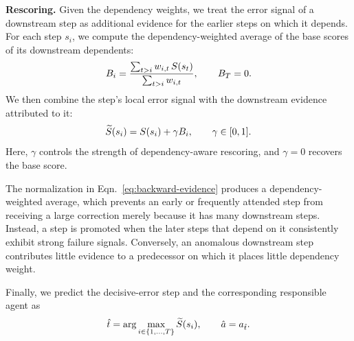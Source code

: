 \textbf{Rescoring.}
Given the dependency weights, we treat the error signal of a downstream
step as additional evidence for the earlier steps on which it depends.
For each step $s_i$, we compute the dependency-weighted average of the
base scores of its downstream dependents:
\begin{equation}
    B_i
    =
    \frac{
        \sum_{t>i}
        w_{i,t}\,S(s_t)
    }{
        \sum_{t>i}w_{i,t}
    },
    \qquad
    B_T=0.
    \label{eq:backward-evidence}
\end{equation}
We then combine the step's local error signal with the downstream evidence attributed to it:
\begin{equation}
    \widetilde{S}(s_i)
    =
    S(s_i)
    +
    \gamma B_i,
    \qquad
    \gamma\in[0,1].
    \label{eq:recap}
\end{equation}
Here, $\gamma$ controls the strength of dependency-aware rescoring, and
$\gamma=0$ recovers the base score.

The normalization in Eqn.~\ref{eq:backward-evidence} produces a
dependency-weighted average, which prevents an early or frequently attended step from receiving a
large correction merely because it has many downstream steps.
Instead, a step is promoted when the later steps that depend on it
consistently exhibit strong failure signals.
Conversely, an anomalous downstream step contributes little evidence to
a predecessor on which it places little dependency weight.


Finally, we predict the decisive-error step and the corresponding
responsible agent as
\begin{equation}
    \hat{t}
    =
    \arg\max_{i\in\{1,\ldots,T\}}
    \widetilde{S}(s_i),
    \qquad
    \hat{a}
    =
    a_{\hat{t}}.
    \label{eq:prediction}
\end{equation}





